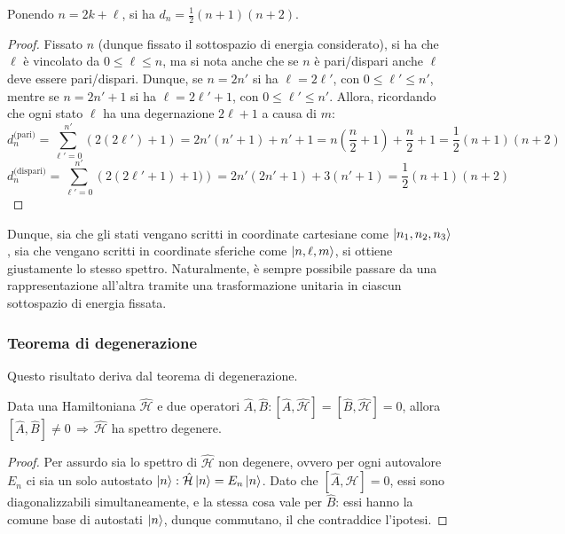\begin{proposition}
	Ponendo $ n = 2k + \ell $, si ha $ d_n = \frac{1}{2}(n + 1)(n + 2) $.
\end{proposition}
\begin{proof}
	Fissato $ n $ (dunque fissato il sottospazio di energia considerato), si ha che $ \ell $ è vincolato da $ 0 \le \ell \le n $, ma si nota anche che se $ n $ è pari/dispari anche $ \ell $ deve essere pari/dispari. Dunque, se $ n = 2n' $ si ha $ \ell = 2\ell' $, con $ 0 \le \ell' \le n' $, mentre se $ n = 2n' + 1 $ si ha $ \ell = 2\ell' + 1 $, con $ 0 \le \ell' \le n' $. Allora, ricordando che ogni stato $ \ell $ ha una degernazione $ 2\ell + 1 $ a causa di $ m $:
	\begin{equation*}
		d_n^{\text{(pari)}} = \sum_{\ell' = 0}^{n'} \left( 2(2\ell') + 1 \right) = 2 n' (n' + 1) + n' + 1 = n \left( \frac{n}{2} + 1 \right) + \frac{n}{2} + 1 = \frac{1}{2} (n + 1) (n + 2)
	\end{equation*}
	\begin{equation*}
		d_n^{\text{(dispari)}} = \sum_{\ell' = 0}^{n'} \left( 2 (2\ell' + 1) + 1) \right) = 2n' (2n' + 1) + 3 (n' + 1) = \frac{1}{2} (n + 1) (n + 2)
	\end{equation*}
\end{proof}

Dunque, sia che gli stati vengano scritti in coordinate cartesiane come $ \ket{n_1, n_2, n_3} $, sia che vengano scritti in coordinate sferiche come $ \ket{n,\ell,m} $, si ottiene giustamente lo stesso spettro. Naturalmente, è sempre possibile passare da una rappresentazione all'altra tramite una trasformazione unitaria in ciascun sottospazio di energia fissata.

\subsubsection{Teorema di degenerazione}

Questo risultato deriva dal teorema di degenerazione.

\begin{theorem}
	Data una Hamiltoniana $ \hat{\mathcal{H}} $ e due operatori $ \hat{A}, \hat{B} : [\hat{A},\hat{\mathcal{H}}] = [\hat{B},\hat{\mathcal{H}}] = 0 $, allora $ [\hat{A},\hat{B}] \neq 0 \,\Rightarrow\, \hat{\mathcal{H}} $ ha spettro degenere.
\end{theorem}
\begin{proof}
	Per assurdo sia lo spettro di $ \hat{\mathcal{H}} $ non degenere, ovvero per ogni autovalore $ E_n $ ci sia un solo autostato $ \ket{n} : \hat{\mathcal{H}}\ket{n} = E_n\ket{n} $. Dato che $ [\hat{A},\hat{\mathcal{H}}] = 0 $, essi sono diagonalizzabili simultaneamente, e la stessa cosa vale per $ \hat{B} $: essi hanno la comune base di autostati $ \ket{n} $, dunque commutano, il che contraddice l'ipotesi.
\end{proof}

